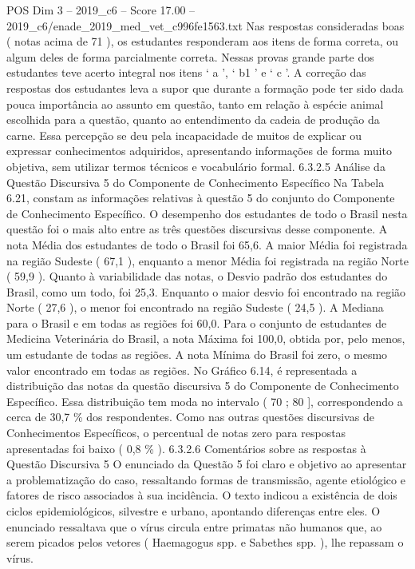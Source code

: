 \begin{textsample}{POS Dim 3 – 2019\_c6 – Score 17.00 – 2019\_c6/enade\_2019\_med\_vet\_c996fe1563.txt}
Nas respostas consideradas boas ( notas acima de 71 ), os estudantes responderam aos itens de forma correta, ou algum deles de forma parcialmente correta.
Nessas provas grande parte dos estudantes teve acerto integral nos itens ‘ a ’, ‘ b1 ’ e ‘ c ’.
A correção das respostas dos estudantes leva a supor que durante a formação pode ter sido dada pouca importância ao assunto em questão, tanto em relação à espécie animal escolhida para a questão, quanto ao entendimento da cadeia de produção da carne.
Essa percepção se deu pela incapacidade de muitos de explicar ou expressar conhecimentos adquiridos, apresentando informações de forma muito objetiva, sem utilizar termos técnicos e vocabulário formal. 6.3.2.5 Análise da Questão Discursiva 5 do Componente de Conhecimento Específico Na Tabela 6.21, constam as informações relativas à questão 5 do conjunto do Componente de Conhecimento Específico.
O desempenho dos estudantes de todo o Brasil nesta questão foi o mais alto entre as três questões discursivas desse componente.
A nota Média dos estudantes de todo o Brasil foi 65,6.
A maior Média foi registrada na região Sudeste ( 67,1 ), enquanto a menor Média foi registrada na região Norte ( 59,9 ).
Quanto à variabilidade das notas, o Desvio padrão dos estudantes do Brasil, como um todo, foi 25,3.
Enquanto o maior desvio foi encontrado na região Norte ( 27,6 ), o menor foi encontrado na região Sudeste ( 24,5 ).
A Mediana para o Brasil e em todas as regiões foi 60,0.
Para o conjunto de estudantes de Medicina Veterinária do Brasil, a nota Máxima foi 100,0, obtida por, pelo menos, um estudante de todas as regiões.
A nota Mínima do Brasil foi zero, o mesmo valor encontrado em todas as regiões.
No Gráfico 6.14, é representada a distribuição das notas da questão discursiva 5 do Componente de Conhecimento Específico.
Essa distribuição tem moda no intervalo ( 70 ; 80 ], correspondendo a cerca de 30,7 \% dos respondentes.
Como nas outras questões discursivas de Conhecimentos Específicos, o percentual de notas zero para respostas apresentadas foi baixo ( 0,8 \% ). 6.3.2.6 Comentários sobre as respostas à Questão Discursiva 5 O enunciado da Questão 5 foi claro e objetivo ao apresentar a problematização do caso, ressaltando formas de transmissão, agente etiológico e fatores de risco associados à sua incidência.
O texto indicou a existência de dois ciclos epidemiológicos, silvestre e urbano, apontando diferenças entre eles.
O enunciado ressaltava que o vírus circula entre primatas não humanos que, ao serem picados pelos vetores ( Haemagogus spp. e Sabethes spp. ), lhe repassam o vírus.

\end{textsample}
